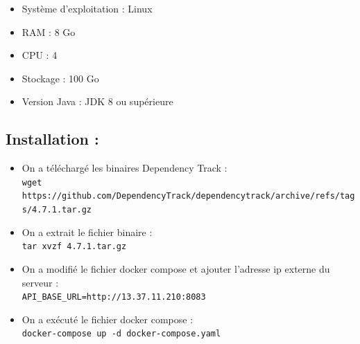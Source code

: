 \begin{itemize}
\item Système d’exploitation : Linux
\item RAM : 8 Go
\item CPU : 4
\item Stockage : 100 Go
\item Version Java : JDK 8 ou supérieure
\end{itemize}

\subsection*{Installation :}

\begin{itemize}
\item On a téléchargé les binaires Dependency Track : \\
\texttt{wget https://github.com/DependencyTrack/dependencytrack/archive/refs/tags/4.7.1.tar.gz}

\item On a extrait le fichier binaire : \\
\texttt{tar xvzf 4.7.1.tar.gz}

\item On a modifié le fichier docker compose et ajouter l’adresse ip externe du serveur : \\
\texttt{API\_BASE\_URL=http://13.37.11.210:8083}

\item On a exécuté le fichier docker compose : \\
\texttt{docker-compose up -d docker-compose.yaml}
\end{itemize}

